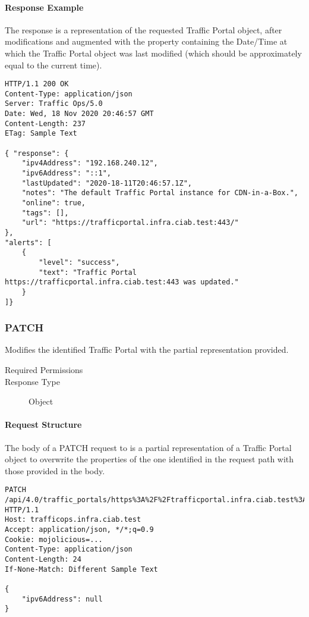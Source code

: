 \paragraph{Response Example}
The response is a representation of the requested Traffic Portal object, after
modifications and augmented with the  property containing the
Date/Time at which the Traffic Portal object was last modified (which should be
approximately equal to the current time).

\begin{codelisting}
\begin{verbatim}
HTTP/1.1 200 OK
Content-Type: application/json
Server: Traffic Ops/5.0
Date: Wed, 18 Nov 2020 20:46:57 GMT
Content-Length: 237
ETag: Sample Text

{ "response": {
	"ipv4Address": "192.168.240.12",
	"ipv6Address": "::1",
	"lastUpdated": "2020-18-11T20:46:57.1Z",
	"notes": "The default Traffic Portal instance for CDN-in-a-Box.",
	"online": true,
	"tags": [],
	"url": "https://trafficportal.infra.ciab.test:443/"
},
"alerts": [
	{
		"level": "success",
		"text": "Traffic Portal https://trafficportal.infra.ciab.test:443 was updated."
	}
]}
\end{verbatim}
\end{codelisting}

\subsubsection{PATCH}
Modifies the identified Traffic Portal with the partial representation provided.

\begin{description}
	\item[Required Permissions] 
	\item[Response Type] Object
\end{description}

\paragraph{Request Structure}
The body of a PATCH request to  is a partial
representation of a Traffic Portal object to overwrite the properties of the one
identified in the request path with those provided in the body.

\begin{codelisting}
\begin{verbatim}
PATCH /api/4.0/traffic_portals/https%3A%2F%2Ftrafficportal.infra.ciab.test%3A443 HTTP/1.1
Host: trafficops.infra.ciab.test
Accept: application/json, */*;q=0.9
Cookie: mojolicious=...
Content-Type: application/json
Content-Length: 24
If-None-Match: Different Sample Text

{
	"ipv6Address": null
}
\end{verbatim}
\end{codelisting}

